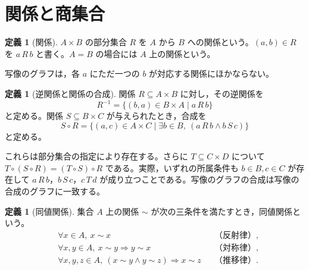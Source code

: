 \documentclass[a5paper,10pt,dvipdfmx]{jsarticle}
\theoremstyle{definition}
\newtheorem{defn}[ruledef]{定義}
\theoremstyle{plain}
\newcommand{\impc}{\Longrightarrow}
\begin{document}
\section{関係と商集合}
\begin{defn}[関係]\label{k50}
$A\times B$ の部分集合 $R$ を $A$ から $B$ への関係という。$(a,b)\in R$ を $a\,R\,b$ と書く。$A=B$ の場合には $A$ 上の関係という。
\end{defn}
写像のグラフは，各 $a$ にただ一つの $b$ が対応する関係にほかならない。
\begin{defn}[逆関係と関係の合成]\label{k51}
関係 $R\subseteq A\times B$ に対し，その逆関係を
\[
 R^{-1}=\{(b,a)\in B\times A\mid a\,R\,b\}
\]
と定める。関係 $S\subseteq B\times C$ が与えられたとき，合成を
\[
 S\circ R=\{(a,c)\in A\times C\mid
 \exists b\in B,\ (a\,R\,b\land b\,S\,c)\}
\]
と定める。
\end{defn}
これらは部分集合の指定により存在する。さらに $T\subseteq C\times D$ について $T\circ(S\circ R)=(T\circ S)\circ R$ である。実際，いずれの所属条件も $b\in B,c\in C$ が存在して $a\,R\,b$，$b\,S\,c$，$c\,T\,d$ が成り立つことである。写像のグラフの合成は写像の合成のグラフに一致する。
\begin{defn}[同値関係]\label{k52}
集合 $A$ 上の関係 $\sim$ が次の三条件を満たすとき，同値関係という。
\begin{align*}
 &\forall x\in A,\ x\sim x &&\text{（反射律）},\\
 &\forall x,y\in A,\ x\sim y\impc y\sim x &&\text{（対称律）},\\
 &\forall x,y,z\in A,\ (x\sim y\land y\sim z)\impc x\sim z
 &&\text{（推移律）}.
\end{align*}
\end{defn}
\end{document}
